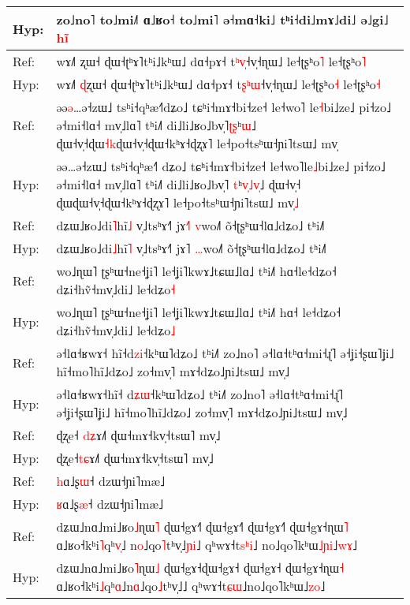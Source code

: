 \documentclass[10pt]{article}
\DeclareRobustCommand{\hl}[1]{{\textcolor{red}{#1}}}
\begin{document}
\begin{longtable}{ll}
Hyp: & zo˩no˥ to˩mi˩˥ ɑ˩ʁo˧ to˩mi˥ ə˧mɑ˧ki˩ tʰi˧di˩mɤ˩di˩ ə˩gi˩ \hl{h}\hl{i}\hl{̃} \\ 
\midrule 
Ref: & wɤ˩˥ ʐɯ˧ ɖɯ˧ʈʰɤ˥tʰi˩kʰɯ˩ dɑ˧pɤ˧ t\hl{ʰ}\hl{v}\hl{̩}˧v̩˧ɳɯ˩ le˧ʈʂʰo\hl{˥} le˧ʈʂʰo\hl{˥} \\ 
Hyp: & wɤ˩˥ \hl{ɖ}ʐɯ˧ ɖɯ˧ʈʰɤ˥tʰi˩kʰɯ˩ dɑ˧pɤ˧ t\hl{ʂ}\hl{ʰ}\hl{ɯ}˧v̩˧ɳɯ˩ le˧ʈʂʰo\hl{˧} le˧ʈʂʰo\hl{˧} \\ 
\midrule 
Ref: & əə\hl{ə}…ə˧zɯ˩ tsʰi˧qʰæ˧˥dʑo˩ tɕʰi˧mɤ˧bi˧ze˧ le˧wo˥\hl{ }le\hl{˧}bi˩ze˩ pi˧zo˩ ə˧mi˧lɑ˧ mv̩˩lɑ˥ tʰi˩˥ di˩li˩ʁo˩bv̩˥\hl{ʈ}\hl{ʂ}ʰ\hl{ɯ}˩ ɖɯ˧v̩˧ɖɯ\hl{˧}\hl{k}ɖɯ˧v̩˧ɖɯ˧kʰɤ˧ɖʐɤ˥ le˧po˧tsʰɯ˧ɲi˥tsɯ˩ mv̩ \\ 
Hyp: & əə…ə˧zɯ˩ tsʰi˧qʰæ˧˥\hl{ }dʑo˩ tɕʰi˧mɤ˧bi˧ze˧ le˧wo˥le\hl{˩}bi˩ze˩ pi˧zo˩ ə˧mi˧lɑ˧ mv̩˩lɑ˥ tʰi˩˥ di˩li˩ʁo˩bv̩˥\hl{ }\hl{t}ʰ\hl{v}\hl{̩}\hl{˩}\hl{v}\hl{̩}˩ ɖɯ˧v̩˧\hl{ }ɖɯɖɯ˧v̩˧ɖɯ˧kʰɤ˧ɖʐɤ˥ le˧po˧tsʰɯ˧ɲi˥tsɯ˩ mv̩\hl{˩} \\ 
\midrule 
Ref: & dʑɯ˩ʁo˩di\hl{˥}hĩ\hl{˩} v̩˩tsʰɤ˧˥ jɤ\hl{˧}˥ \hl{v}wo˩˥ õ˧ʈʂʰɯ˧lɑ˩dʑo˩ tʰi˩˥ \\ 
Hyp: & dʑɯ˩ʁo˩di\hl{˩}hĩ\hl{˥} v̩˩tsʰɤ˧˥ jɤ˥ \hl{…}wo˩˥ õ˧ʈʂʰɯ˧lɑ˩dʑo˩ tʰi˩˥ \\ 
\midrule 
Ref: & wo˩ɳɯ˥ ʈʂʰɯ˧ne˧ʝi˥ le˧ʝi˥kwɤ˩tɕɯ˩lɑ˩ tʰi˩˥ hɑ˧le˧dʑo˧ dʑi˧hṽ˧mv̩˩di˩ le˧dʑo\hl{˧} \\ 
Hyp: & wo˩ɳɯ˥ ʈʂʰɯ˧ne˧ʝi˥ le˧ʝi˥kwɤ˩tɕɯ˩lɑ˩ tʰi˩˥ hɑ˧\hl{ }le˧dʑo˧ dʑi˧hṽ˧mv̩˩di˩ le˧dʑo\hl{˩} \\ 
\midrule 
Ref: & ə˧lɑ˧ʁwɤ˧\hl{ }hĩ˧d\hl{z}\hl{i}˧kʰɯ˥dʑo˩ tʰi˩˥ zo˩no˥ ə˧lɑ˧tʰɑ˧mi˧ɻ̍˥ ə˧ʝi˧ʂɯ˥ʝi˩ hĩ˧mo˥hĩ˩dʑo˩ zo˧mv̩˥ mɤ˧dʑo˩ɲi˩tsɯ˩ mv̩˩ \\ 
Hyp: & ə˧lɑ˧ʁwɤ˧hĩ˧\hl{ }d\hl{ʑ}\hl{ɯ}˧kʰɯ˥dʑo˩ tʰi˩˥ zo˩no˥ ə˧lɑ˧tʰɑ˧mi˧ɻ̍˥ ə˧ʝi˧ʂɯ˥ʝi˩ hĩ˧mo˥hĩ˩dʑo˩ zo˧mv̩˥ mɤ˧dʑo˩ɲi˩tsɯ˩ mv̩˩ \\ 
\midrule 
Ref: & ɖʐe˧\hl{ }\hl{d}\hl{ʑ}ɤ˩˥ ɖɯ˧mɤ˧kv̩˧tsɯ˥ mv̩˩ \\ 
Hyp: & ɖʐe˧\hl{t}\hl{ɕ}ɤ˩˥ ɖɯ˧mɤ˧kv̩˧tsɯ˥ mv̩˩ \\ 
\midrule 
Ref: & \hl{h}ɑ˩ʂ\hl{ɯ}˧ dzɯ˧ɲi˥mæ˩ \\ 
Hyp: & \hl{ʁ}ɑ˩ʂ\hl{æ}˧ dzɯ˧ɲi˥mæ˩ \\ 
\midrule 
Ref: & dʑɯ˩nɑ˩mi˩ʁo\hl{˩}ɳɯ\hl{˥} ɖɯ˧gɤ˧\hl{˥}\hl{ }ɖɯ˧gɤ˧\hl{˥} ɖɯ˧gɤ˧\hl{˥} ɖɯ˧gɤ˧ɳɯ\hl{˥} ɑ˩ʁo˧kʰi\hl{˥}qʰ\hl{v}\hl{̩}˩\hl{ }n\hl{o}˩qo\hl{˥}tʰv̩˩\hl{ɲ}\hl{i}˩ qʰwɤ˧t\hl{s}\hl{ʰ}\hl{i}˩\hl{ }no˩qo˥kʰɯ\hl{˩}\hl{ɲ}\hl{i}˩\hl{w}\hl{ɤ}˩ \\ 
Hyp: & dʑɯ˩nɑ˩mi˩ʁo\hl{˥}ɳɯ\hl{˩} ɖɯ˧gɤ˧ɖɯ˧gɤ˧ ɖɯ˧gɤ˧ ɖɯ˧gɤ˧ɳɯ\hl{˧} ɑ˩ʁo˧kʰi\hl{˩}qʰ\hl{ɑ}˩n\hl{ɑ}˩qo\hl{˩}tʰv̩˩˩ qʰwɤ˧t\hl{ɕ}\hl{ɯ}˩no˩qo˥kʰɯ˩\hl{z}\hl{o}˩ \\ 

\end{longtable}
\end{document}
